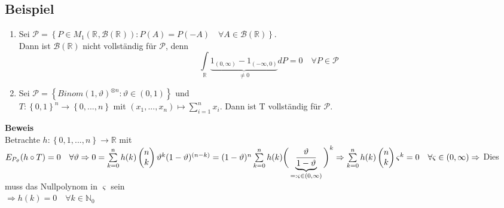 \documentclass[german,10pt,oneside, fleqn, a4paper]{article}
\newcommand {\R}	{\mathbb{R}}
\newcommand {\N}	{\mathbb{N}}
\newcommand{\Ra}	{\Rightarrow}
\newcommand{\ra}{\rightarrow}
\newcommand{\sm}[2][\infty]{\sum\limits_{#2}^{#1}}
\newcommand{\brc}[1]{\left(#1\right)}
\newcommand{\brac}[1]{\left\lbrace #1\right\rbrace}
\newcommand{\mat}[1]{\begin{pmatrix}#1\end{pmatrix}}
\newcommand{\mc}[1]{\mathcal{#1}}
\newcommand{\beweis}{\textbf{Beweis}\\}
\newcommand{\1}[1]{1_{#1}}
\newcommand{\2}[1]{\1{\brac{#1}}}
\newcommand{\rbor}[1][d]{\brc{\R^{#1},\mc{B}\brc{\R^{#1}}}}
\newcommand{\intr}{\int\limits_\R}
\newcommand{\stuff}{{\otimes n}}
\begin{document}
\subsection{Beispiel}
\label{11.7}\begin{enumerate}[label=(\alph*)]
\item Sei $\mc{P}=\brac{P\in M_1\rbor[]:P(A)=P(-A)\quad\forall A\in\mc{B}(\R)}$.\\
Dann ist $\mc{B}(\R)$ nicht vollständig für $\mc{P}$, denn \[
\intr \underbrace{1_{(0,\infty)}-1_{(-\infty,0)}}_{\neq0}dP=0\quad\forall P\in\mc{P}\]
\item Sei $\mc{P}=\brac{Binom(1,\vartheta)^\stuff:\vartheta\in(0,1)}$ und \\
$T:\brac{0,1}^n\ra\brac{0,...,n}$ mit $(x_1,...,x_n)\mapsto\sm[n]{i=1}x_i$. Dann ist T vollständig für $\mc{P}$.
\end{enumerate}
\beweis
Betrachte $h:\brac{0,1,...,n}\ra\R$ mit $E_{P_\vartheta}(h\circ T)=0\quad\forall \vartheta\\
\Ra 0=\sm[n]{k=0}h(k)\mat{n\\k}\vartheta^k(1-\vartheta)^{(n-k)}\\
= (1-\vartheta)^n\sm[n]{k=0}h(k)\bigg(\underbrace{\dfrac{\vartheta}{1-\vartheta}}_{=:\varsigma\in(0,\infty)}\bigg)^k\\
\Ra\sm[n]{k=0}h(k)\mat{n\\k}\varsigma^k=0\quad\forall\varsigma\in(0,\infty)\\
\Ra$ Dies muss das Nullpolynom in $\varsigma$ sein\\
$\Ra h(k)=0\quad \forall k\in\N_0$
\end{document}
